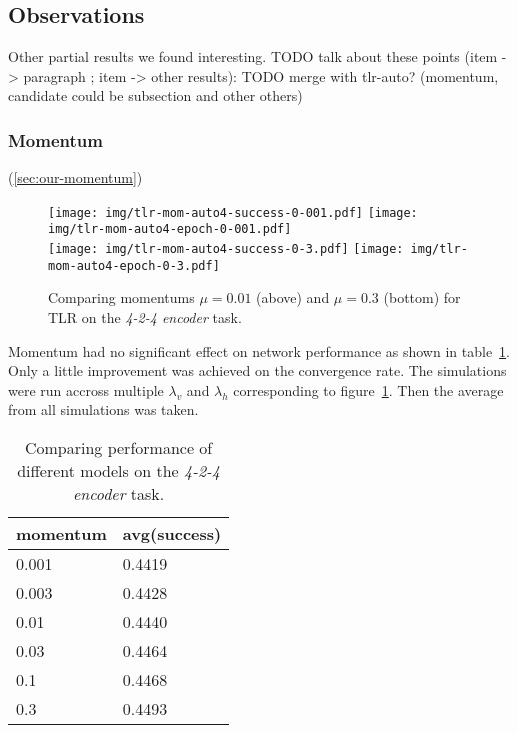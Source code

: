 
\subsection{Observations}
\label{sec:results-other} 

Other partial results we found interesting. 
TODO talk about these points (item -> paragraph ; item -> other results): 
TODO merge with tlr-auto? (momentum, candidate could be subsection and other others) 

 

\subsubsection{Momentum}
\label{sec:results-momentum} 

(\ref{sec:our-momentum}) 

\begin{figure}[H]
  \centering
  \texttt{[image: img/tlr-mom-auto4-success-0-001.pdf]}  
  \texttt{[image: img/tlr-mom-auto4-epoch-0-001.pdf]}  \\
  \texttt{[image: img/tlr-mom-auto4-success-0-3.pdf]}  
  \texttt{[image: img/tlr-mom-auto4-epoch-0-3.pdf]}  
  \caption{Comparing momentums $\mu=0.01$ (above) and $\mu=0.3$ (bottom) for TLR on the \emph{4-2-4 encoder} task.}
  \label{fig:results-tlr-auto4-momentum}
\end{figure}

Momentum had no significant effect on network performance as shown in table~\ref{tab:results-mom-auto4}. Only a little improvement was achieved on the convergence rate. The simulations were run accross multiple $\lambda_v$ and $\lambda_h$ corresponding to figure~\ref{fig:results-tlr-auto4-momentum}. Then the average from all simulations was taken. 
\begin{table}[H] 
  \centering
  {\small
    \begin{tabular}{|l|l|}
    \hline
momentum & avg(success) \\
    \hline
0.001  & 0.4419 \\
    \hline
0.003  & 0.4428 \\
    \hline
0.01   & 0.4440 \\
    \hline
0.03   & 0.4464 \\
    \hline
0.1    & 0.4468 \\
    \hline
0.3    & 0.4493 \\
    \hline
    \end{tabular}
  }
  \caption{Comparing performance of different models on the \emph{4-2-4 encoder} task.} 
  \label{tab:results-mom-auto4}
\end{table}


 
